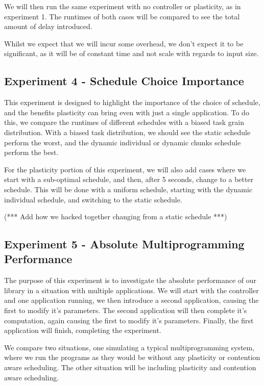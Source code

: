 We will then run the same experiment with no controller or plasticity, as in experiment 1. The runtimes of both cases will be compared to see the total amount of delay introduced.

Whilst we expect that we will incur some overhead, we don't expect it to be significant, as it will be of constant time and not scale with regards to input size.





\subsection{Experiment 4 - Schedule Choice Importance}

This experiment is designed to highlight the importance of the choice of schedule, and the benefits plasticity can bring even with just a single application. To do this, we compare the runtimes of different schedules with a biased task grain distribution. With a biased task distribution, we should see the static schedule perform the worst, and the dynamic individual or dynamic chunks schedule perform the best.

For the plasticity portion of this experiment, we will also add cases where we start with a sub-optimal schedule, and then, after 5 seconds, change to a better schedule. This will be done with a uniform schedule, starting with the dynamic individual schedule, and switching to the static schedule.

(*** Add how we hacked together changing from a static schedule ***)





\subsection{Experiment 5 - Absolute Multiprogramming Performance}

The purpose of this experiment is to investigate the absolute performance of our library in a situation with multiple applications. We will start with the controller and one application running, we then introduce a second application, causing the first to modify it's parameters. The second application will then complete it's computation, again causing the first to modify it's parameters. Finally, the first application will finish, completing the experiment. 

We compare two situations, one simulating a typical multiprogramming system, where we run the programs as they would be without any plasticity or contention aware scheduling. The other situation will be including plasticity and contention aware scheduling.

